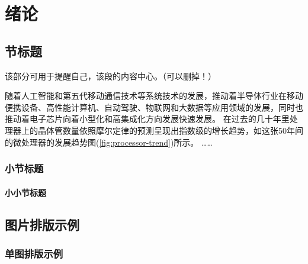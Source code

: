     
\chapter{绪论}\label{ch:1}
\section{节标题}

\begin{shaded}
    该部分可用于提醒自己，该段的内容中心。（可以删掉！）
    \end{shaded}

    随着人工智能和第五代移动通信技术等系统技术的发展\cite{Lau_2022}，推动着半导体行业在移动便携设备、高性能计算机、自动驾驶、物联网和大数据等应用领域的发展\cite{Lau_2022}，同时也推动着电子芯片向着小型化和高集成化方向发展快速发展\cite{Sadique.Murtaza.ea_2022}。
在过去的几十年里处理器上的晶体管数量依照摩尔定律\cite{Tan.Du.ea_2021}的预测呈现出指数级的增长趋势，如这张50年间的微处理器的发展趋势图(\cref{fig:processor-trend})所示。
……

\subsection{小节标题}
\subsubsection{小小节标题}

\section{图片排版示例}
\subsection{单图排版示例}

